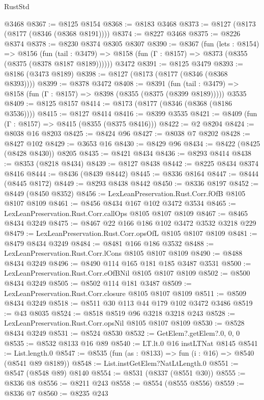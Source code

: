 \begin{lexlean}{RustStd}
\begin{coremodule}
{\begin{coremodule}
{{{{{{{{{{{{{{{{{{{{{{{{{{{{{{{{{{{{{{{{{{{{{    @3468
@8367 := @8125 @8154
@8368 := @8183 @3468
@8373 := @8127 (@8173 (@8177 (@8346 (@8368 @8191))))
@8374 := @8227 @3468
@8375 := @8226 @8374
@8378 := @8230 @8374 @8305 @8307
@8390 := @8367
    (fun (lets : @8154) =>
    @8156
      (fun (tail : @3479) => @8158 (fun (Γ : @8157) => @8373 (@8355 (@8375 (@8378 @8187 @8189))))))
    @3472
@8391 := @8125 @3479
@8393 := @8186 (@3473 @8189)
@8398 := @8127 (@8173 (@8177 (@8346 (@8368 @8393))))
@8399 := @8378 @3472
@8408 := @8391
    (fun (tail : @3479) => @8158 (fun (Γ : @8157) => @8398 (@8355 (@8375 (@8399 @8189)))))
    @3535
@8409 := @8125 @8157
@8414 := @8173 (@8177 (@8346 (@8368 (@8186 @3536))))
@8415 := @8127 @8414
@8416 := @8399 @3535
@8421 := @8409 (fun (Γ : @8157) => @8415 (@8355 (@8375 @8416)))
@8422 := @2 @8204
@8424 := @8038 @16 @8203
@8425 := @8424 @96
@8427 := @8038 @7 @8202
@8428 := @8427 @102
@8429 := @3653 @16
@8430 := @8429 @96
@8434 := @8422 (@8425 (@8428 @8430)) @8205
@8435 := @8421 @8434
@8436 := @8293 @8414
@8438 := @8353 (@8218 @8434)
@8439 := @8127 @8438
@8442 := @8225 @8434 @8374 @8416
@8444 := @8436 (@8439 @8442)
@8445 := @8336 @8164
@8447 := @8444 (@8445 @8172)
@8449 := @8293 @8438 @8442
@8450 := @8336 @8197
@8452 := @8449 (@8450 @8352)
@8456 := LexLeanPreservation.Rust.Corr.fOfB @8105 @8107 @8109
@8461 := @8456 @8434 @167 @102 @3472 @3534
@8465 := LexLeanPreservation.Rust.Corr.callOps @8105 @8107 @8109
@8467 := @8465 @8434 @3249
@8475 := @8467 @22 @166 @186 @102 @3472 @3532 @3218 @229
@8479 := LexLeanPreservation.Rust.Corr.opsOfL @8105 @8107 @8109
@8481 := @8479 @8434 @3249
@8484 := @8481 @166 @186 @3532
@8488 := LexLeanPreservation.Rust.Corr.lCons @8105 @8107 @8109
@8490 := @8488 @8434 @3249
@8496 := @8490 @114 @165 @181 @185 @3487 @3531
@8500 := LexLeanPreservation.Rust.Corr.eOfBNil @8105 @8107 @8109
@8502 := @8500 @8434 @3249
@8505 := @8502 @114 @181 @3487
@8509 := LexLeanPreservation.Rust.Corr.closure @8105 @8107 @8109
@8511 := @8509 @8434 @3249
@8518 := @8511 @30 @113 @44 @179 @102 @3472 @3486
@8519 := @43 @8035
@8524 := @8518 @8519 @96 @3218 @3218 @243
@8528 := LexLeanPreservation.Rust.Corr.opsNil @8105 @8107 @8109
@8530 := @8528 @8434 @3249
@8531 := @8524 @8530
@8532 := GetElem?.getElem?.{0, 0, 0}
@8535 := @8532 @8133 @16 @89
@8540 := LT.lt.{0} @16 instLTNat @8145
@8541 := List.length.{0}
@8547 := @8535 (fun (as : @8133) => fun (i : @16) => @8540 (@8541 @89 @8189))
@8548 := List.instGetElem?NatLtLength.{0}
@8551 := @8547 (@8548 @89) @8140
@8554 := @8531 (@8337 (@8551 @30))
@8555 := @8336 @8
@8556 := @8211 @243
@8558 := @8554 (@8555 @8556)
@8559 := @8336 @7
@8560 := @8235 @243
}}}}}}}}}}}}}}}}}}}}}}}}}}}}}}}}}}}}}}}}}}}}}
\end{coremodule}}
\end{coremodule}
\end{lexlean}
